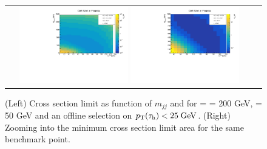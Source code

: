 \begin{figure}[tbh!]
	\centering
	\begin{tabular}{cc}
		\includegraphics[width=0.45\textwidth]{analysis/pics/JetInvMass_vs_MET_xsec_chi200_lsp050_taupt25.pdf}
		\includegraphics[width=0.45\textwidth]{analysis/pics/JetInvMass_vs_MET_xsec_chi200_lsp050_taupt25_zoom.pdf} 		
	\end{tabular}
	\caption{(Left) Cross section limit as function of $m_{jj}$ and \met for \charginopm = \neutralinotwo = 200 GeV, \neutralinoone = 50 GeV and an offline selection on $p_{\text{T}}(\tau_{\text{h}}) <  25\;\text{Ge}\kern-0.06667em\text{V}$. (Right) Zooming into the minimum cross section limit area for the same benchmark point.}
	\label{fig::JetInvMass_vs_MET_xsec_chi200_lsp050_taupt25}
\end{figure}

